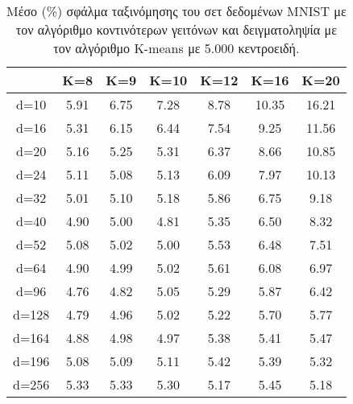 \begin{table}[H]
\singlespacing
\centering
\label{tab:table4}
\caption{Μέσο (\%) σφάλμα ταξινόμησης του σετ δεδομένων \textlatin{MNIST} με τον αλγόριθμο κοντινότερων γειτόνων και δειγματοληψία με τον αλγόριθμο \textlatin{K-means} με 5.000 κεντροειδή.}
\vspace*{5mm}
\begin{tabular}{|c|c|c|c|c|c|c|}
\hline
& K=8 & K=9 & K=10 & K=12 & K=16 & K=20 \\
\hline
d=10 & 5.91 & 6.75 & 7.28 & 8.78 & 10.35 & 16.21 \\
d=16 & 5.31 & 6.15 & 6.44 & 7.54 & 9.25 & 11.56 \\
d=20 & 5.16 & 5.25 & 5.31 & 6.37 & 8.66 & 10.85 \\
d=24 & 5.11 & 5.08 & 5.13 & 6.09 & 7.97 & 10.13 \\
d=32 & 5.01 & 5.10 & 5.18 & 5.86 & 6.75 & 9.18 \\
d=40 & 4.90 & 5.00 & 4.81 & 5.35 & 6.50 & 8.32 \\
d=52 & 5.08 & 5.02 & 5.00 & 5.53 & 6.48 & 7.51 \\
d=64 & 4.90 & 4.99 & 5.02 & 5.61 & 6.08 & 6.97 \\
d=96 & 4.76 & 4.82 & 5.05 & 5.29 & 5.87 & 6.42 \\
d=128 & 4.79 & 4.96 & 5.02 & 5.22 & 5.70 & 5.77 \\
d=164 & 4.88 & 4.98 & 4.97 & 5.38 & 5.41 & 5.47 \\
d=196 & 5.08 & 5.09 & 5.11 & 5.42 & 5.39 & 5.32 \\
d=256 & 5.33 & 5.33 & 5.30 & 5.17 & 5.45 & 5.18 \\
\hline
\end{tabular}
\end{table}


